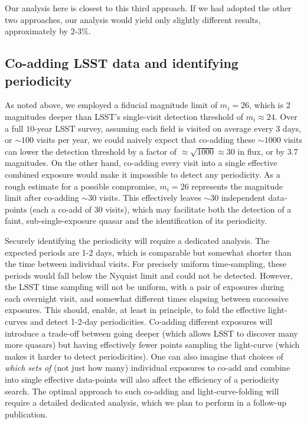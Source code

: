 \documentclass[fleqn,usenatbib]{mnras}
\begin{document}
Our analysis here is closest to this third approach.  If we had adopted the other two approaches, our analysis would yield only slightly different results, approximately by 2-3\%.


\subsection{Co-adding LSST data and identifying periodicity}
\label{sec:folding-lc}

As noted above, we employed a fiducial magnitude limit of $m_i=26$, which is 2 magnitudes deeper than LSST's single-visit detection threshold of $m_i\approx 24$.
Over a full $10$-year LSST survey, assuming each field is visited on average every 3 days, or $\sim 100$ visits per year, we could naively expect that co-adding these $\sim 1000$ visits can lower the detection threshold by a factor of $\approx \sqrt{1000}\approx 30$ in flux, or by 3.7 magnitudes.
On the other hand, co-adding every visit into a single effective combined exposure would make it impossible to detect any periodicity.  As a rough estimate for a possible compromise,  $m_i=26$ represents the magnitude limit after co-adding $\sim 30$ visits. This effectively leaves $\sim 30$ independent data-points (each a co-add of 30 visits), which may facilitate both the detection of a faint, sub-single-exposure quasar and the identification of its periodicity. 

Securely identifying the periodicity will require a dedicated analysis. The expected periods are 1-2 days, which is comparable but somewhat shorter than the time between individual visits. 
For precisely uniform time-sampling, these periods would fall below the Nyquist limit and could not be detected.  However, the LSST time sampling will not be uniform, with a pair of exposures during each overnight visit, and somewhat different times elapsing between successive exposures.   This should, enable, at least in principle, to fold the effective light-curves and detect 1-2-day periodicities.  Co-adding different exposures will introduce a trade-off between going deeper (which allows LSST to discover many more quasars) but having effectively fewer points sampling the light-curve (which makes it harder to detect periodicities).   One can also imagine that choices of {\it which sets of} (not just how many) individual exposures to co-add and combine into single effective data-points will also affect the efficiency of a periodicity search.  The optimal approach to such co-adding and light-curve-folding will require a detailed dedicated analysis, which we plan to perform in a follow-up publication.
\end{document}
